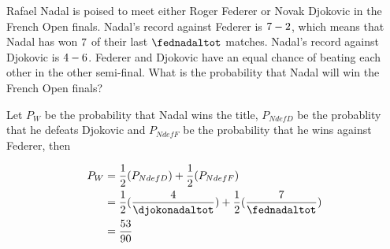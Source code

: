 

\question[3] Rafael Nadal is poised to meet either Roger Federer or Novak 
Djokovic in the French Open finals. Nadal's record against Federer is 
$7-2$, which means that Nadal has won $7$ of their last $\fednadaltot$ matches. Nadal's 
record against Djokovic is $4-6$. Federer and Djokovic have an equal chance of
beating each other in the other semi-final. What is the probability that Nadal will win 
the French Open finals? 


\watchout

\ifprintanswers
\fi 

\begin{solution}[\halfpage]
  Let $P_{W}$ be the probability that Nadal wins the title, 
$P_{NdefD}$ be the probablity that he defeats Djokovic and $P_{NdefF}$  
be the probability that he wins against Federer, then 
   
  \begin{align}
    P_{W} &= \dfrac{1}{2}(P_{NdefD}) + \dfrac{1}{2}(P_{NdefF}) \\
   	  &= \dfrac{1}{2}(\dfrac{\vbtwo}{\djokonadaltot}) + \dfrac{1}{2}(\dfrac{\vbone}{\fednadaltot}) \\ 
   	  &= \dfrac{\vbthree}{\vbfour}
  \end{align}
\end{solution}
